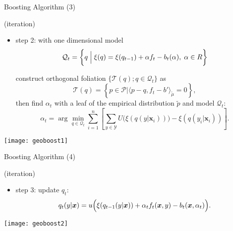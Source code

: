\documentclass[fleqn,aspectratio=1610]{beamer}
\begin{document}
\begin{frame}[label={sec:orga6f004b}]{Boosting Algorithm (3)}
\begin{block}{(iteration)}
\begin{itemize}
\item \alert{step 2:}
with one dimensional model
\begin{equation}
  \mathcal{Q}_t
  =\biggl\{q\Bigm|
  \xi(q)=
  \xi(q_{t-1})+\alpha f_t-b_t(\alpha),\;\alpha\in R\biggr\}
\end{equation}

construct orthogonal foliation
\(\{\mathcal{T}(q);q\in\mathcal{Q}_t\}\) as
\begin{equation}
  \mathcal{T}(q)
  =
  \left\{ p\in\mathcal{P}|
    \langle p-q,f_{t}-b'\rangle_{\tilde{\mu}}=0
  \right\},
\end{equation}
then find \(\alpha_t\) with a leaf of the empirical distribution
\(\tilde{p}\) and model \(\mathcal{Q}_t\):
\begin{equation}
  \alpha_t
  =\arg\min_{q\in\mathcal{Q}_t}
  \sum_{i=1}^{n}
  \left[
    \sum_{y\in\mathcal{Y}}U\bigl(\xi(q(y|\boldsymbol{x}_i))\bigr)
    -\xi(q(y_i|\boldsymbol{x}_i))
  \right].
\end{equation}
\end{itemize}
\end{block}
\end{frame}

\begin{frame}[label={sec:orgfb17494}]{}
\begin{center}
\texttt{[image: geoboost1]}
\end{center}
\end{frame}

\begin{frame}[label={sec:org261e9c8}]{Boosting Algorithm (4)}
\begin{block}{(iteration)}
\begin{itemize}
\item \alert{step 3:}
update \(q_t\):
\begin{equation}
  q_{t}(y|\boldsymbol{x})
  =u\Bigl(\xi(q_{t-1}(y|\boldsymbol{x}))
  +\alpha_t f_t(\boldsymbol{x},y)
  -b_t(\boldsymbol{x},\alpha_t)\Bigr).
\end{equation}
\end{itemize}
\end{block}
\end{frame}

\begin{frame}[label={sec:orgfc50cde}]{}
\begin{center}
\texttt{[image: geoboost2]}
\end{center}
\end{frame}
\end{document}
